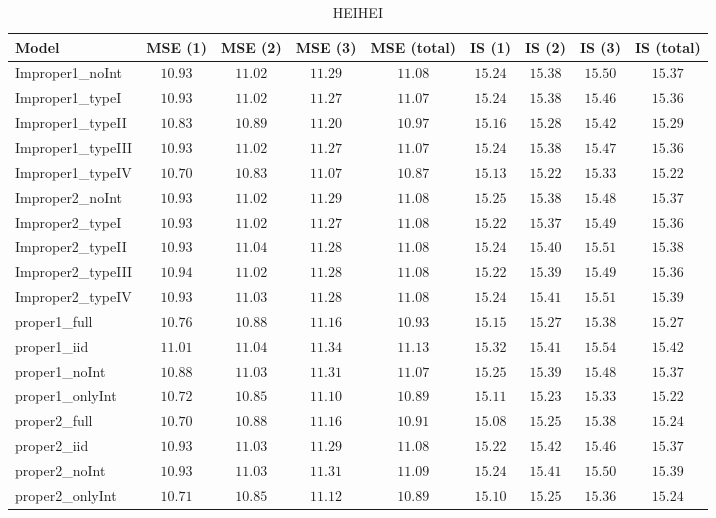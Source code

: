 \begin{table}

\caption{\label{tab:model-choice-sc2}HEIHEI}
\centering
\begin{tabular}{lcccccccc}
\hline
Model  & MSE (1) & MSE (2) & MSE (3) & MSE (total) & IS (1) & IS (2) & IS (3) & \multicolumn{1}{c}{IS (total)} \\ 
\hline
Improper1_noInt  & $10.93$ & $11.02$ & $11.29$ & $11.08$ & $15.24$ & $15.38$ & $15.50$ & $15.37$ \\
Improper1_typeI  & $10.93$ & $11.02$ & $11.27$ & $11.07$ & $15.24$ & $15.38$ & $15.46$ & $15.36$ \\
Improper1_typeII  & $10.83$ & $10.89$ & $11.20$ & $10.97$ & $15.16$ & $15.28$ & $15.42$ & $15.29$ \\
Improper1_typeIII  & $10.93$ & $11.02$ & $11.27$ & $11.07$ & $15.24$ & $15.38$ & $15.47$ & $15.36$ \\
Improper1_typeIV  & $10.70$ & $10.83$ & $11.07$ & $10.87$ & $15.13$ & $15.22$ & $15.33$ & $15.22$ \\
Improper2_noInt  & $10.93$ & $11.02$ & $11.29$ & $11.08$ & $15.25$ & $15.38$ & $15.48$ & $15.37$ \\
Improper2_typeI  & $10.93$ & $11.02$ & $11.27$ & $11.08$ & $15.22$ & $15.37$ & $15.49$ & $15.36$ \\
Improper2_typeII  & $10.93$ & $11.04$ & $11.28$ & $11.08$ & $15.24$ & $15.40$ & $15.51$ & $15.38$ \\
Improper2_typeIII  & $10.94$ & $11.02$ & $11.28$ & $11.08$ & $15.22$ & $15.39$ & $15.49$ & $15.36$ \\
Improper2_typeIV  & $10.93$ & $11.03$ & $11.28$ & $11.08$ & $15.24$ & $15.41$ & $15.51$ & $15.39$ \\
proper1_full  & $10.76$ & $10.88$ & $11.16$ & $10.93$ & $15.15$ & $15.27$ & $15.38$ & $15.27$ \\
proper1_iid  & $11.01$ & $11.04$ & $11.34$ & $11.13$ & $15.32$ & $15.41$ & $15.54$ & $15.42$ \\
proper1_noInt  & $10.88$ & $11.03$ & $11.31$ & $11.07$ & $15.25$ & $15.39$ & $15.48$ & $15.37$ \\
proper1_onlyInt  & $10.72$ & $10.85$ & $11.10$ & $10.89$ & $15.11$ & $15.23$ & $15.33$ & $15.22$ \\
proper2_full  & $10.70$ & $10.88$ & $11.16$ & $10.91$ & $15.08$ & $15.25$ & $15.38$ & $15.24$ \\
proper2_iid  & $10.93$ & $11.03$ & $11.29$ & $11.08$ & $15.22$ & $15.42$ & $15.46$ & $15.37$ \\
proper2_noInt  & $10.93$ & $11.03$ & $11.31$ & $11.09$ & $15.24$ & $15.41$ & $15.50$ & $15.39$ \\
proper2_onlyInt  & $10.71$ & $10.85$ & $11.12$ & $10.89$ & $15.10$ & $15.25$ & $15.36$ & $15.24$ \\
\hline 
\end{tabular}


\end{table}